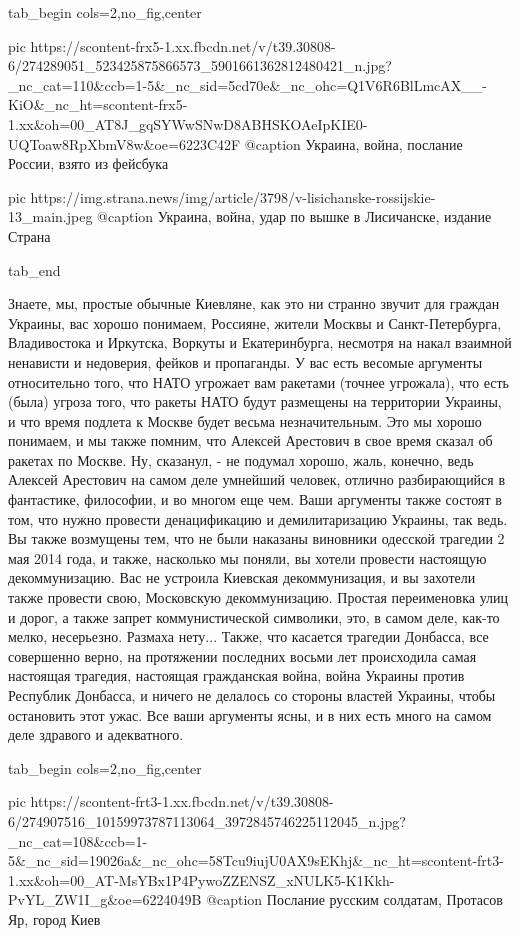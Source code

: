 \ifcmt
  tab_begin cols=2,no_fig,center

     pic https://scontent-frx5-1.xx.fbcdn.net/v/t39.30808-6/274289051_523425875866573_5901661362812480421_n.jpg?_nc_cat=110&ccb=1-5&_nc_sid=5cd70e&_nc_ohc=Q1V6R6BlLmcAX__-KiO&_nc_ht=scontent-frx5-1.xx&oh=00_AT8J_gqSYWwSNwD8ABHSKOAeIpKIE0-UQToaw8RpXbmV8w&oe=6223C42F
		 @caption Украина, война, послание России, взято из фейсбука

		 pic https://img.strana.news/img/article/3798/v-lisichanske-rossijskie-13_main.jpeg
		 @caption Украина, война, удар по вышке в Лисичанске, издание Страна

  tab_end
\fi

Знаете, мы, простые обычные Киевляне, как это ни странно звучит для граждан
Украины, вас хорошо понимаем, Россияне, жители Москвы и Санкт-Петербурга,
Владивостока и Иркутска, Воркуты и Екатеринбурга, несмотря на накал взаимной
ненависти и недоверия, фейков и пропаганды. У вас есть весомые аргументы
относительно того, что НАТО угрожает вам ракетами (точнее угрожала), что есть
(была) угроза того, что ракеты НАТО будут размещены на территории Украины, и
что время подлета к Москве будет весьма незначительным. Это мы хорошо
понимаем, и мы также помним, что Алексей Арестович в свое время сказал об
ракетах по Москве. Ну, сказанул, - не подумал хорошо, жаль, конечно, ведь
Алексей Арестович на самом деле умнейший человек, отлично разбирающийся в
фантастике, философии, и во многом еще чем. Ваши аргументы также состоят в том,
что нужно провести денацификацию и демилитаризацию Украины, так ведь. Вы также
возмущены тем, что не были наказаны виновники одесской трагедии 2 мая 2014
года, и также, насколько мы поняли, вы хотели провести настоящую
декоммунизацию. Вас не устроила Киевская декоммунизация, и вы захотели также
провести свою, Московскую декоммунизацию. Простая переименовка улиц и дорог, а
также запрет коммунистической символики, это, в самом деле, как-то мелко,
несерьезно.  Размаха нету... Также, что касается трагедии Донбасса, все
совершенно верно, на протяжении последних восьми лет происходила самая
настоящая трагедия, настоящая гражданская война, война Украины против Республик
Донбасса, и ничего не делалось со стороны властей Украины, чтобы остановить
этот ужас. Все ваши аргументы ясны, и в них есть много на самом деле здравого и
адекватного. 

\ifcmt
  tab_begin cols=2,no_fig,center

     pic https://scontent-frt3-1.xx.fbcdn.net/v/t39.30808-6/274907516_10159973787113064_3972845746225112045_n.jpg?_nc_cat=108&ccb=1-5&_nc_sid=19026a&_nc_ohc=58Tcu9iujU0AX9sEKhj&_nc_ht=scontent-frt3-1.xx&oh=00_AT-MsYBx1P4PywoZZENSZ_xNULK5-K1Kkh-PvYL_ZW1I_g&oe=6224049B
		 @caption Послание русским солдатам, Протасов Яр, город Киев 

